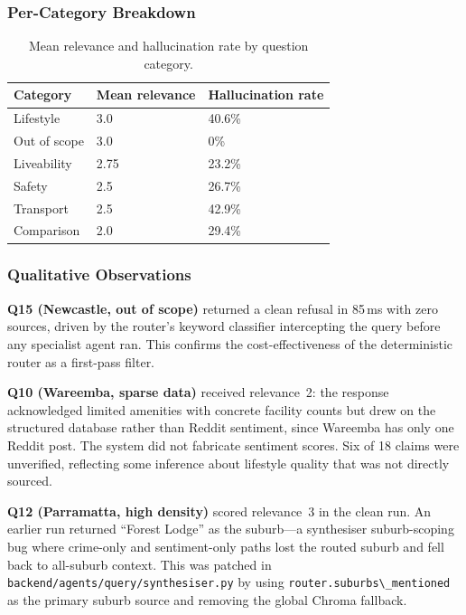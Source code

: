 \documentclass[11pt,a4paper]{article}
\newcommand{\passthrough}[1]{#1}
\begin{document}
\subsubsection{Per-Category Breakdown}

\begin{table}[H]
\centering
\caption{Mean relevance and hallucination rate by question category.}
\begin{tabular}{|l|l|l|}
\hline
\textbf{Category} & \textbf{Mean relevance} & \textbf{Hallucination rate} \\
\hline
Lifestyle & 3.0 & 40.6\% \\
\hline
Out of scope & 3.0 & 0\% \\
\hline
Liveability & 2.75 & 23.2\% \\
\hline
Safety & 2.5 & 26.7\% \\
\hline
Transport & 2.5 & 42.9\% \\
\hline
Comparison & 2.0 & 29.4\% \\
\hline
\end{tabular}
\label{tab:eval-categories}
\end{table}

\subsubsection{Qualitative Observations}

\textbf{Q15 (Newcastle, out of scope)} returned a clean refusal in 85\,ms with zero sources, driven by the router's keyword classifier intercepting the query before any specialist agent ran. This confirms the cost-effectiveness of the deterministic router as a first-pass filter.

\textbf{Q10 (Wareemba, sparse data)} received relevance~2: the response acknowledged limited amenities with concrete facility counts but drew on the structured database rather than Reddit sentiment, since Wareemba has only one Reddit post. The system did not fabricate sentiment scores. Six of 18 claims were unverified, reflecting some inference about lifestyle quality that was not directly sourced.

\textbf{Q12 (Parramatta, high density)} scored relevance~3 in the clean run. An earlier run returned ``Forest Lodge'' as the suburb---a synthesiser suburb-scoping bug where crime-only and sentiment-only paths lost the routed suburb and fell back to all-suburb context. This was patched in \passthrough{\lstinline!backend/agents/query/synthesiser.py!} by using \passthrough{\lstinline!router.suburbs\_mentioned!} as the primary suburb source and removing the global Chroma fallback.
\end{document}
